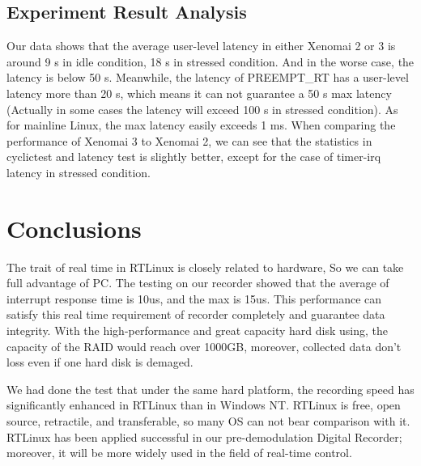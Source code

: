 \documentclass[10pt,a4paper]{article}
\begin{document}
\begin{multicols}{2}
\subsection{Experiment Result Analysis}
Our data shows that the average user-level latency in either Xenomai 2 or 3 is around 9 \textmu s in idle condition, 18 \textmu s in stressed condition. And in the worse case, the latency is below 50 \textmu s. Meanwhile, the latency of PREEMPT\_RT has a user-level latency more than 20 \textmu s, which means it can not guarantee a 50 \textmu s max latency (Actually in some cases the latency will exceed 100 \textmu s in stressed condition).  As for mainline Linux, the max latency easily exceeds 1 ms. When comparing the performance of Xenomai 3 to Xenomai 2, we can see that the statistics in cyclictest and latency test is slightly better, except for the case of timer-irq latency in stressed condition.

\section{Conclusions}
The trait of real time in RTLinux is closely related to hardware, So we can take full advantage of PC. The testing on our recorder showed that the average of interrupt response time is 10us, and the max  is 15us. This performance can satisfy this real time requirement of recorder completely and guarantee data integrity. With the high-performance and  great capacity hard disk using, the capacity of the RAID would reach over 1000GB, moreover, collected data don't loss even if one hard disk is demaged.

We had done the test that  under the same hard platform, the recording speed has significantly enhanced in RTLinux than in Windows NT. RTLinux is free, open source, retractile, and transferable, so many OS can not bear comparison with it. RTLinux has been applied successful in our pre-demodulation Digital Recorder; moreover, it will be more widely used in the field of real-time control.


\end{multicols}
\end{document}
